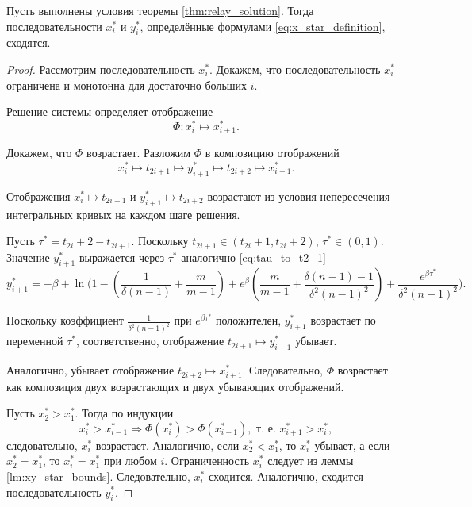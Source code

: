 \begin{lemma}
	\label{lm:convergence_x_star}
	Пусть выполнены условия теоремы \ref{thm:relay_solution}. Тогда последовательности $x^*_i$ и $y^*_i$, определённые формулами \eqref{eq:x_star_definition}, сходятся.
\end{lemma}
\begin{proof}
	
	Рассмотрим последовательность $x^*_i$. Докажем, что последовательность $x^*_i$ ограничена и монотонна для достаточно больших $i$.
	
	Решение системы определяет отображение
	\begin{equation}
		\label{eq:flow_relay}
		\Phi: x^*_i \mapsto x^*_{i + 1}.
	\end{equation}
	
	Докажем, что $\Phi$ возрастает. Разложим $\Phi$ в композицию отображений
	\begin{equation}
		x^*_i \mapsto t_{2i + 1} \mapsto y^*_{i + 1} \mapsto t_{2i + 2} \mapsto x^*_{i + 1}.
	\end{equation}
	
	Отображения $x^*_i \mapsto t_{2i + 1}$ и $y^*_{i + 1} \mapsto t_{2i + 2}$ возрастают из условия непересечения интегральных кривых на каждом шаге решения.
	
	Пусть $\tau^* = t_{2i} + 2 - t_{2i + 1} $. Поскольку $t_{2i + 1} \in (t_{2i} + 1, t_{2i} + 2)$, $\tau^* \in (0, 1)$. Значение $y^*_{i + 1}$ выражается через $\tau^*$ аналогично \eqref{eq:tau_to_t2+1}
	\footnotesize
	\[
	y^*_{i + 1} = -\beta + \ln\Bigg( 1 - \left(\frac{1}{\delta(n - 1)} + \frac{m}{m - 1}\right) +  e^{\beta} \left(\frac{m}{m - 1} + \frac{\delta(n - 1) - 1}{\delta^2 (n - 1)^2}\right) +  \frac{e^{\beta \tau^*}}{\delta^2 (n - 1)^2} \Bigg).
	\]
	\normalsize
	
	Поскольку коэффициент $\frac{1}{\delta^2 (n - 1)^2}$ при $e^{\beta \tau^*}$ положителен, $y^*_{i + 1}$ возрастает по переменной $\tau^*$, соответственно, отображение $t_{2i + 1} \mapsto y^*_{i + 1}$ убывает.
	
	Аналогично, убывает отображение $t_{2i + 2} \mapsto x^*_{i + 1}$. Следовательно, $\Phi$ возрастает как композиция двух возрастающих и двух убывающих отображений.
	
	Пусть $x^*_2 > x^*_1$. Тогда по индукции
	\[
	x^*_{i} > x^*_{i - 1} \Rightarrow \Phi(x^*_i) > \Phi(x^*_{i - 1}), \text{ т.~е. } x^*_{i + 1} > x^*_{i},
	\]
	следовательно, $x^*_i$ возрастает. Аналогично, если $x^*_2 < x^*_1$, то $x^*_i$ убывает, а если $x^*_2 = x^*_1$, то $x^*_i = x^*_1$ при любом $i$. Ограниченность $x^*_i$ следует из леммы \ref{lm:xy_star_bounds}. Следовательно, $x^*_i$ сходится. Аналогично, сходится последовательность $y^*_i$.
\end{proof}


